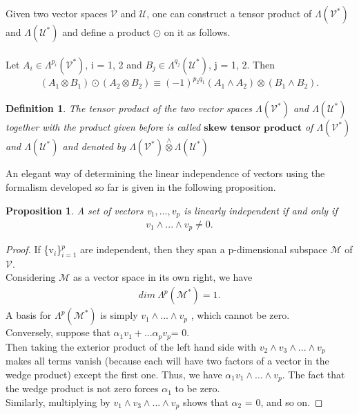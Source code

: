 \documentclass[12pt,a4paper]{article}
\newtheorem{defn}[thm]{Definition}
\newtheorem{prop}{Proposition}
\begin{document}
\indent Given two vector spaces $\mathcal{V}$ and $\mathcal{U}$, one can construct a tensor product
of $\Lambda(\mathcal{V}^*)$ and $\Lambda(\mathcal{U}^*)$ and define a product $\odot$ on it as follows.\\\\ Let $A_i \in \Lambda^{p_i}(\mathcal{V}^*)$, i = 1, 2 and  $B_j \in \Lambda^{q_j}(\mathcal{U}^*)$, j = 1, 2. Then \\
\begin{align*}
(A_1 \otimes B_1) \odot (A_2 \otimes B_2) \equiv (-1)^{p_2 q_1}(A_1 \wedge A_2) \otimes ( B_1 \wedge B_2). 
\end{align*}
\begin{defn}
The tensor product of the two vector spaces $\Lambda(\mathcal{V}^*)$ and $\Lambda(\mathcal{U}^*)$ together with the product given before is called $\textbf{skew tensor product}$ of  $\Lambda(\mathcal{V}^*)$ and $\Lambda(\mathcal{U}^*)$ and denoted by  $\Lambda(\mathcal{V}^*) \overset{\wedge}{\otimes} \Lambda(\mathcal{U}^*)$
\end{defn}
An elegant way of determining the linear independence of vectors using
the formalism developed so far is given in the following proposition.\\
\begin{prop}\label{prop1}
A set of vectors v$_1,...,v_p$ is linearly independent if
and only if
\begin{align*} 
v_1 \wedge ... \wedge v_p \ne 0.
\end{align*}
\end{prop}
\begin{proof}
If \{v$_i$\}$^p_{i=1}$ are independent, then they span a p-dimensional subspace $\mathcal{M}$ of $\mathcal{V}$.\\ Considering $\mathcal{M}$ as a vector space in its own right, we have
\begin{align*}
dim \ \Lambda^{p}(\mathcal{M}^*) = 1. 
\end{align*}
A basis for $\Lambda^{p}(\mathcal{M}^*)$ is simply $v_1 \wedge ... \wedge v_p$ , which cannot
be zero. \\
\indent Conversely, suppose that $\alpha_1 v_1 + ... \alpha_p v_p $= 0. \\Then taking the exterior
product of the left hand side with $v_2 \wedge v_3 \wedge ... \wedge v_p$ makes all terms vanish (because
each will have two factors of a vector in the wedge product) except the first
one. Thus, we have $\alpha_1 v_1 \wedge ... \wedge v_p $.  The fact that the wedge product is
not zero forces $\alpha_1$ to be zero. \\Similarly, multiplying by $v_1 \wedge v_3 \wedge ... \wedge v_p$ shows that $\alpha_2$ = 0, and so on.
\end{proof}
\end{document}
